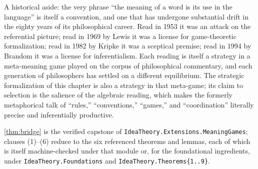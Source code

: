 A historical aside: the very phrase ``the meaning of a word is its
use in the language'' is itself a convention, and one that has
undergone substantial drift in the eighty years of its
philosophical career. Read in 1953 it was an attack on the
referential picture; read in 1969 by Lewis it was a license for
game-theoretic formalization; read in 1982 by Kripke it was a
sceptical premise; read in 1994 by Brandom it was a license for
inferentialism. Each reading is itself a strategy in a meta-meaning
game played on the corpus of philosophical commentary, and each
generation of philosophers has settled on a different equilibrium.
The strategic formalization of this chapter is also a strategy in
that meta-game; its claim to selection is the salience of the
algebraic reading, which makes the formerly metaphorical talk of
``rules,'' ``conventions,'' ``games,'' and ``coordination''
literally precise and inferentially productive.

\formalstatus \cref{thm:bridge} is the verified capstone of
\texttt{IdeaTheory.Extensions.MeaningGames}; clauses (1)--(6) reduce
to the six referenced theorems and lemmas, each of which is itself
machine-checked under that module or, for the foundational
ingredients, under \texttt{IdeaTheory.Foundations} and
\texttt{IdeaTheory.Theorems\{1..9\}}.
